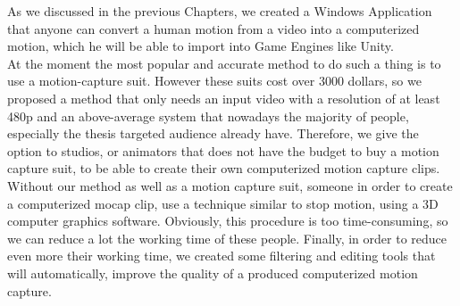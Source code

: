 As we discussed in the previous Chapters, we created a Windows Application that anyone can convert a human motion from a video into a computerized motion, which he will be able to import into Game Engines like Unity.\\ 

At the moment the most popular and accurate method to do such a thing is to use a motion-capture suit. However these suits cost over 3000 dollars, so we proposed a method that only needs an input video with a resolution of at least 480p and an above-average system that nowadays the majority of people, especially the thesis targeted audience already have. Therefore, we give the option to studios, or animators that does not have the budget to buy a motion capture suit, to be able to create their own computerized motion capture clips. Without our method as well as a motion capture suit, someone in order to create a computerized mocap clip, use a technique similar to stop motion, using a 3D computer graphics software. Obviously, this procedure is too time-consuming, so we can reduce a lot the working time of these people. Finally, in order to reduce even more their working time, we created some filtering and editing tools that will automatically, improve the quality of a produced computerized motion capture.